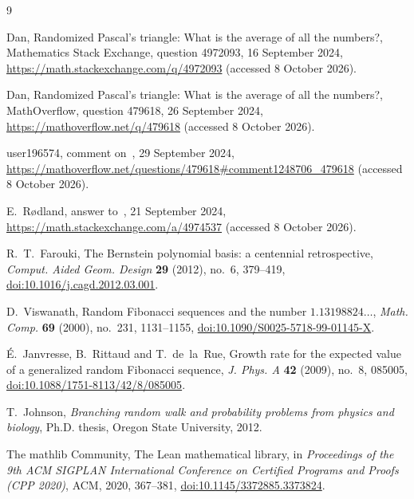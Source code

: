 \documentclass[11pt]{article}
\theoremstyle{remark}
\begin{document}
\begin{thebibliography}{9}

 Dan, Randomized Pascal's triangle: What is the average of all the numbers?, Mathematics Stack Exchange, question 4972093, 16 September 2024, \url{https://math.stackexchange.com/q/4972093} (accessed 8 October 2026).

 Dan, Randomized Pascal's triangle: What is the average of all the numbers?, MathOverflow, question 479618, 26 September 2024, \url{https://mathoverflow.net/q/479618} (accessed 8 October 2026).

 user196574, comment on~\cite{MO}, 29 September 2024, \url{https://mathoverflow.net/questions/479618#comment1248706_479618} (accessed 8 October 2026).

 E.~R{\o}dland, answer to~\cite{MSE}, 21 September 2024, \url{https://math.stackexchange.com/a/4974537} (accessed 8 October 2026).

 R.~T.~Farouki, The Bernstein polynomial basis: a centennial retrospective, \emph{Comput. Aided Geom. Design} \textbf{29} (2012), no.~6, 379--419, \href{https://doi.org/10.1016/j.cagd.2012.03.001}{doi:10.1016/j.cagd.2012.03.001}.

 D.~Viswanath, Random Fibonacci sequences and the number $1.13198824\ldots$, \emph{Math. Comp.} \textbf{69} (2000), no.~231, 1131--1155, \href{https://doi.org/10.1090/S0025-5718-99-01145-X}{doi:10.1090/S0025-5718-99-01145-X}.

 \'E.~Janvresse, B.~Rittaud and T.~de~la~Rue, Growth rate for the expected value of a generalized random Fibonacci sequence, \emph{J. Phys. A} \textbf{42} (2009), no.~8, 085005, \href{https://doi.org/10.1088/1751-8113/42/8/085005}{doi:10.1088/1751-8113/42/8/085005}.

 T.~Johnson, \emph{Branching random walk and probability problems from physics and biology}, Ph.D. thesis, Oregon State University, 2012.

 The mathlib Community, The Lean mathematical library, in \emph{Proceedings of the 9th ACM SIGPLAN International Conference on Certified Programs and Proofs (CPP 2020)}, ACM, 2020, 367--381, \href{https://doi.org/10.1145/3372885.3373824}{doi:10.1145/3372885.3373824}.

\end{thebibliography}
\end{document}
